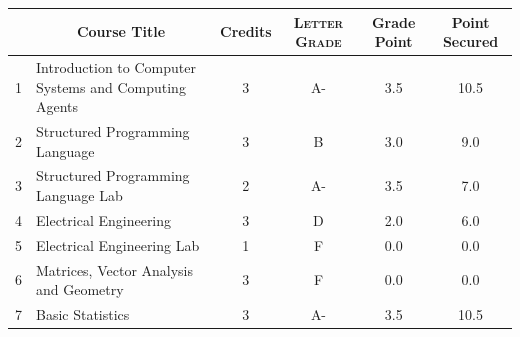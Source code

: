 \documentclass[11pt]{article}
\newcommand*{\numtwo}[1]{\pgfmathprintnumber[
                    fixed, precision=2, fixed zerofill=true]{#1}}
\begin{document}
                \begin{center}
                    \renewcommand{\arraystretch}{1.08}
                    
                \begin{tabular}{|c|l|c|>{\scshape}c|c|c|}
                \hline  \rule[-1ex]{0pt}{3.5ex} {\centering{\bf Course Code}} &  \multicolumn{1}{c|}{\textbf{Course Title}}  & {\bf Credits} & {\bf Letter Grade} & {\bf Grade Point} & {\bf Point Secured}  \\ 
                \hline   1 &  Introduction to Computer Systems and Computing Agents		 & 3 & A- & 3.5 & 10.5 \\ %
                \hline   2 &  Structured Programming Language		 & 3 & B & 3.0 & 9.0 \\ %
                \hline   3 &  Structured Programming Language Lab		 & 2 & A- & 3.5 & 7.0 \\ %
                \hline   4 &  Electrical Engineering		 & 3 & D & 2.0 & 6.0 \\ %
                \hline   5 &  Electrical Engineering Lab		 & 1 & F & 0.0 & 0.0 \\ %
                \hline   6 &  Matrices, Vector Analysis and Geometry		 & 3 & F & 0.0 & 0.0 \\ %
                \hline   7 &  Basic Statistics		 & 3 & A- & 3.5 & 10.5 \\ %

\hline                %
                \end{tabular}
                \end{center}
                \renewcommand{\arraystretch}{1.03}
\end{document}
